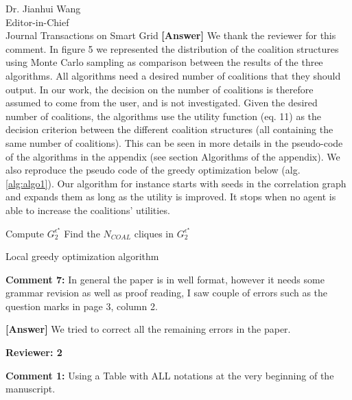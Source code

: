 \documentclass{letter}
\begin{document}
\begin{letter}{Dr. Jianhui Wang \\ Editor-in-Chief \\ Journal Transactions on Smart Grid }
\textbf{[Answer]} We thank the reviewer for this comment. In figure 5 we represented the distribution of the coalition structures using Monte Carlo sampling as comparison between the results of the three algorithms. All algorithms need a desired number of coalitions that they should output. In our work, the decision on the number of coalitions is therefore assumed to come from the user, and is not investigated. Given the desired number of coalitions, the algorithms use the utility function (eq. 11) as the decision criterion between the different coalition structures (all containing the same number of coalitions). This can be seen in more details in the pseudo-code of the algorithms in the appendix (see section Algorithms of the appendix). We also reproduce the pseudo code of the greedy optimization below (alg. \ref{alg:algo1}). Our algorithm for instance starts with seeds in the correlation graph and expands them as long as the utility is improved. It stops when no agent is able to increase the coalitions’ utilities.


\begin{algorithm}
 Compute $ G_{2}^{\epsilon^{\star}} $ \;
 Find the $ N_{COAL} $ cliques in $ G_{2}^{\epsilon^{\star}} $\;
 \caption{Local greedy optimization algorithm}
 \label{alg:algo1}
\end{algorithm}

\textbf{Comment 7:} In general the paper is in well format, however it needs some grammar revision as well as proof reading, I saw couple of errors such as the question marks in page 3, column 2.


\textbf{[Answer]} We tried to correct all the remaining errors in the paper.



\textbf{Reviewer: 2}

\textbf{Comment 1:} Using a Table with ALL notations at the very beginning of the manuscript.


\end{letter}
\end{document}
